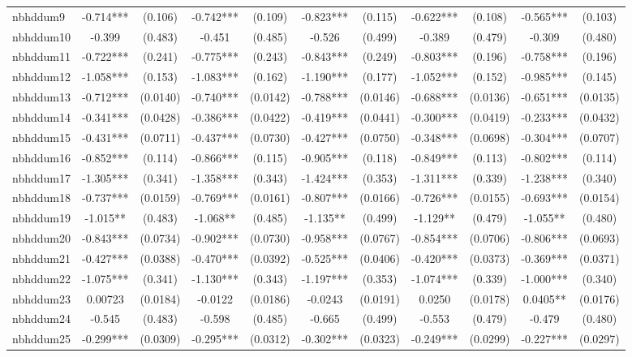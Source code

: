 \documentclass[]{article}
\begin{document}
\begin{tabular}{lcccccccccc}
nbhddum9 & -0.714*** & (0.106) & -0.742*** & (0.109) & -0.823*** & (0.115) & -0.622*** & (0.108) & -0.565*** & (0.103) \\
nbhddum10 & -0.399 & (0.483) & -0.451 & (0.485) & -0.526 & (0.499) & -0.389 & (0.479) & -0.309 & (0.480) \\
nbhddum11 & -0.722*** & (0.241) & -0.775*** & (0.243) & -0.843*** & (0.249) & -0.803*** & (0.196) & -0.758*** & (0.196) \\
nbhddum12 & -1.058*** & (0.153) & -1.083*** & (0.162) & -1.190*** & (0.177) & -1.052*** & (0.152) & -0.985*** & (0.145) \\
nbhddum13 & -0.712*** & (0.0140) & -0.740*** & (0.0142) & -0.788*** & (0.0146) & -0.688*** & (0.0136) & -0.651*** & (0.0135) \\
nbhddum14 & -0.341*** & (0.0428) & -0.386*** & (0.0422) & -0.419*** & (0.0441) & -0.300*** & (0.0419) & -0.233*** & (0.0432) \\
nbhddum15 & -0.431*** & (0.0711) & -0.437*** & (0.0730) & -0.427*** & (0.0750) & -0.348*** & (0.0698) & -0.304*** & (0.0707) \\
nbhddum16 & -0.852*** & (0.114) & -0.866*** & (0.115) & -0.905*** & (0.118) & -0.849*** & (0.113) & -0.802*** & (0.114) \\
nbhddum17 & -1.305*** & (0.341) & -1.358*** & (0.343) & -1.424*** & (0.353) & -1.311*** & (0.339) & -1.238*** & (0.340) \\
nbhddum18 & -0.737*** & (0.0159) & -0.769*** & (0.0161) & -0.807*** & (0.0166) & -0.726*** & (0.0155) & -0.693*** & (0.0154) \\
nbhddum19 & -1.015** & (0.483) & -1.068** & (0.485) & -1.135** & (0.499) & -1.129** & (0.479) & -1.055** & (0.480) \\
nbhddum20 & -0.843*** & (0.0734) & -0.902*** & (0.0730) & -0.958*** & (0.0767) & -0.854*** & (0.0706) & -0.806*** & (0.0693) \\
nbhddum21 & -0.427*** & (0.0388) & -0.470*** & (0.0392) & -0.525*** & (0.0406) & -0.420*** & (0.0373) & -0.369*** & (0.0371) \\
nbhddum22 & -1.075*** & (0.341) & -1.130*** & (0.343) & -1.197*** & (0.353) & -1.074*** & (0.339) & -1.000*** & (0.340) \\
nbhddum23 & 0.00723 & (0.0184) & -0.0122 & (0.0186) & -0.0243 & (0.0191) & 0.0250 & (0.0178) & 0.0405** & (0.0176) \\
nbhddum24 & -0.545 & (0.483) & -0.598 & (0.485) & -0.665 & (0.499) & -0.553 & (0.479) & -0.479 & (0.480) \\
nbhddum25 & -0.299*** & (0.0309) & -0.295*** & (0.0312) & -0.302*** & (0.0323) & -0.249*** & (0.0299) & -0.227*** & (0.0297) \\

\end{tabular}
\end{document}

